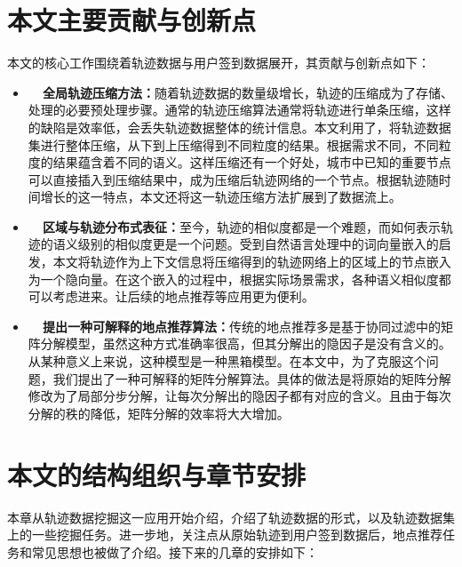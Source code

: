 \section{本文主要贡献与创新点}
本文的核心工作围绕着轨迹数据与用户签到数据展开，其贡献与创新点如下：
\begin{itemize}
  \item \textbf{~~全局轨迹压缩方法：}随着轨迹数据的数量级增长，轨迹的压缩成为了存储、处理的必要预处理步骤。通常的轨迹压缩算法通常将轨迹进行单条压缩，这样的缺陷是效率低，会丢失轨迹数据整体的统计信息。本文利用了，将轨迹数据集进行整体压缩，从下到上压缩得到不同粒度的结果。根据需求不同，不同粒度的结果蕴含着不同的语义。这样压缩还有一个好处，城市中已知的重要节点可以直接插入到压缩结果中，成为压缩后轨迹网络的一个节点。根据轨迹随时间增长的这一特点，本文还将这一轨迹压缩方法扩展到了数据流上。
  \item \textbf{~~区域与轨迹分布式表征：}至今，轨迹的相似度都是一个难题，而如何表示轨迹的语义级别的相似度更是一个问题。受到自然语言处理中的词向量嵌入的启发，本文将轨迹作为上下文信息将压缩得到的轨迹网络上的区域上的节点嵌入为一个隐向量。在这个嵌入的过程中，根据实际场景需求，各种语义相似度都可以考虑进来。让后续的地点推荐等应用更为便利。
  \item \textbf{~~提出一种可解释的地点推荐算法：}传统的地点推荐多是基于协同过滤中的矩阵分解模型，虽然这种方式准确率很高，但其分解出的隐因子是没有含义的。从某种意义上来说，这种模型是一种黑箱模型。在本文中，为了克服这个问题，我们提出了一种可解释的矩阵分解算法。具体的做法是将原始的矩阵分解修改为了局部分步分解，让每次分解出的隐因子都有对应的含义。且由于每次分解的秩的降低，矩阵分解的效率将大大增加。
\end{itemize}

\section{本文的结构组织与章节安排}
本章从轨迹数据挖掘这一应用开始介绍，介绍了轨迹数据的形式，以及轨迹数据集上的一些挖掘任务。进一步地，关注点从原始轨迹到用户签到数据后，地点推荐任务和常见思想也被做了介绍。接下来的几章的安排如下：

